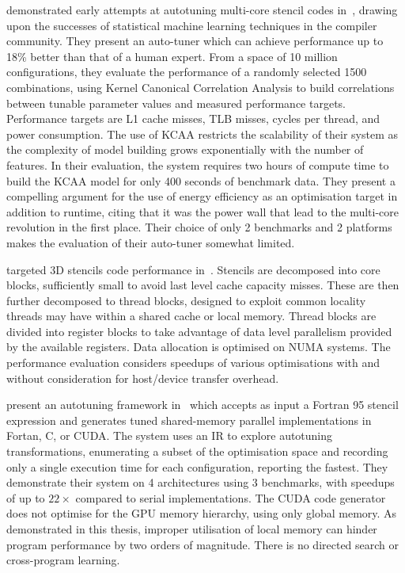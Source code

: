 \citeauthor{Ganapathi2009} demonstrated early attempts at autotuning multi-core stencil codes in~\cite{Ganapathi2009}, drawing upon the successes of statistical machine learning techniques in the compiler community. They present an auto-tuner which can achieve performance up to 18\% better than that of a human expert. From a space of 10 million configurations, they evaluate the performance of a randomly selected 1500 combinations, using Kernel Canonical Correlation Analysis to build correlations between tunable parameter values and measured performance targets. Performance targets are L1 cache misses, TLB misses, cycles per thread, and power consumption. The use of KCAA restricts the scalability of their system as the complexity of model building grows exponentially with the number of features. In their evaluation, the system requires two hours of compute time to build the KCAA model for only 400 seconds of benchmark data. They present a compelling argument for the use of energy efficiency as an optimisation target in addition to runtime, citing that it was the power wall that lead to the multi-core revolution in the first place. Their choice of only 2 benchmarks and 2 platforms makes the evaluation of their auto-tuner somewhat limited.

\citeauthor{Berkeley2009} targeted 3D stencils code performance in~\cite{Berkeley2009}. Stencils are decomposed into core blocks, sufficiently small to avoid last level cache capacity misses. These are then further decomposed to thread blocks, designed to exploit common locality threads may have within a shared cache or local memory. Thread blocks are divided into register blocks to take advantage of data level parallelism provided by the available registers. Data allocation is optimised on NUMA systems. The performance evaluation considers speedups of various optimisations with and without consideration for host/device transfer overhead.

\citeauthor{Kamil2010} present an autotuning framework in~\cite{Kamil2010} which accepts as input a Fortran 95 stencil expression and generates tuned shared-memory parallel implementations in Fortan, C, or CUDA. The system uses an IR to explore autotuning transformations, enumerating a subset of the optimisation space and recording only a single execution time for each configuration, reporting the fastest. They demonstrate their system on 4 architectures using 3 benchmarks, with speedups of up to $22\times$ compared to serial implementations. The CUDA code generator does not optimise for the GPU memory hierarchy, using only global memory. As demonstrated in this thesis, improper utilisation of local memory can hinder program performance by two orders of magnitude. There is no directed search or cross-program learning.

